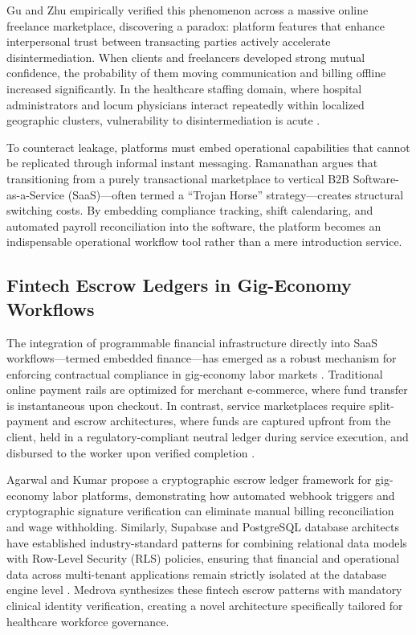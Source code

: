 \documentclass[conference]{IEEEtran}
\begin{document}
Gu and Zhu \cite{gu2021trust} empirically verified this phenomenon across a massive online freelance marketplace, discovering a paradox: platform features that enhance interpersonal trust between transacting parties actively accelerate disintermediation. When clients and freelancers developed strong mutual confidence, the probability of them moving communication and billing offline increased significantly. In the healthcare staffing domain, where hospital administrators and locum physicians interact repeatedly within localized geographic clusters, vulnerability to disintermediation is acute \cite{ramanathan2023switching}. 

To counteract leakage, platforms must embed operational capabilities that cannot be replicated through informal instant messaging. Ramanathan \cite{ramanathan2023switching} argues that transitioning from a purely transactional marketplace to vertical B2B Software-as-a-Service (SaaS)---often termed a ``Trojan Horse'' strategy---creates structural switching costs. By embedding compliance tracking, shift calendaring, and automated payroll reconciliation into the software, the platform becomes an indispensable operational workflow tool rather than a mere introduction service.

\subsection{Fintech Escrow Ledgers in Gig-Economy Workflows}
The integration of programmable financial infrastructure directly into SaaS workflows---termed embedded finance---has emerged as a robust mechanism for enforcing contractual compliance in gig-economy labor markets \cite{jurafsky2024embedded}. Traditional online payment rails are optimized for merchant e-commerce, where fund transfer is instantaneous upon checkout. In contrast, service marketplaces require split-payment and escrow architectures, where funds are captured upfront from the client, held in a regulatory-compliant neutral ledger during service execution, and disbursed to the worker upon verified completion \cite{razorpay2024webhooks}.

Agarwal and Kumar \cite{agarwal2023cryptographic} propose a cryptographic escrow ledger framework for gig-economy labor platforms, demonstrating how automated webhook triggers and cryptographic signature verification can eliminate manual billing reconciliation and wage withholding. Similarly, Supabase and PostgreSQL database architects have established industry-standard patterns for combining relational data models with Row-Level Security (RLS) policies, ensuring that financial and operational data across multi-tenant applications remain strictly isolated at the database engine level \cite{supabase2024rls}. Medrova synthesizes these fintech escrow patterns with mandatory clinical identity verification, creating a novel architecture specifically tailored for healthcare workforce governance.
\end{document}
